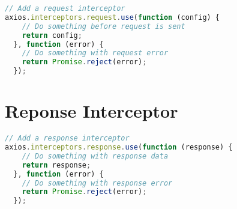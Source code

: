 \begin{lstlisting}[language=JavaScript]
// Add a request interceptor
axios.interceptors.request.use(function (config) {
    // Do something before request is sent
    return config;
  }, function (error) {
    // Do something with request error
    return Promise.reject(error);
  });
\end{lstlisting}

\section{Reponse Interceptor}


\begin{lstlisting}[language=JavaScript]
// Add a response interceptor
axios.interceptors.response.use(function (response) {
    // Do something with response data
    return response;
  }, function (error) {
    // Do something with response error
    return Promise.reject(error);
  });
\end{lstlisting}






\begin{lstlisting}[language=JavaScript]

\end{lstlisting}




\begin{lstlisting}[language=JavaScript]

\end{lstlisting}




\begin{lstlisting}[language=JavaScript]

\end{lstlisting}



\begin{lstlisting}[language=JavaScript]

\end{lstlisting}



\begin{lstlisting}[language=JavaScript]

\end{lstlisting}




\begin{lstlisting}[language=JavaScript]

\end{lstlisting}



